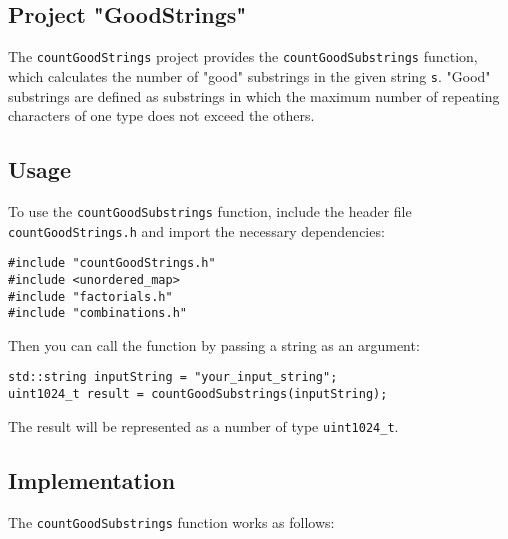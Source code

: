 \documentclass{article}
\begin{document}
\begin{center}
  \section*{Project "GoodStrings"}
\end{center}

The \texttt{countGoodStrings} project provides the \texttt{countGoodSubstrings} function, which calculates the number of "good" substrings in the given string \texttt{s}. "Good" substrings are defined as substrings in which the maximum number of repeating characters of one type does not exceed the others.

\subsection*{Usage}

To use the \texttt{countGoodSubstrings} function, include the header file \texttt{countGoodStrings.h} and import the necessary dependencies:

\begin{verbatim}
#include "countGoodStrings.h"
#include <unordered_map>
#include "factorials.h"
#include "combinations.h"
\end{verbatim}

Then you can call the function by passing a string as an argument:

\begin{verbatim}
std::string inputString = "your_input_string";
uint1024_t result = countGoodSubstrings(inputString);
\end{verbatim}

The result will be represented as a number of type \texttt{uint1024\_t}.

\subsection*{Implementation}

The \texttt{countGoodSubstrings} function works as follows:
\end{document}
